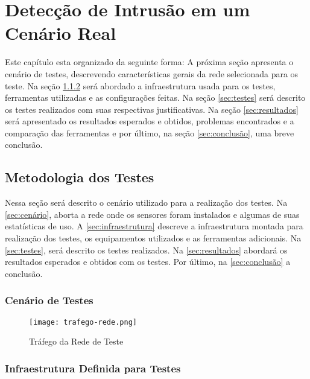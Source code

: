 \chapter{Detecção de Intrusão em um Cenário Real} \label{ch:cenário-real}

Este capítulo esta organizado da seguinte forma: A próxima seção apresenta o cenário de testes, descrevendo características gerais da rede selecionada para os teste. Na seção \ref{sec:infraestrutura} será abordado a infraestrutura usada para os testes, ferramentas utilizadas e as configurações feitas. Na seção \ref{sec:testes} será descrito os testes realizados com suas respectivas justificativas. Na seção \ref{sec:resultados} será apresentado os resultados esperados e obtidos, problemas encontrados e a comparação das ferramentas e por último, na seção \ref{sec:conclusão}, uma breve conclusão.

\section{Metodologia dos Testes}

Nessa seção será descrito o cenário utilizado para a realização dos testes. Na \autoref{sec:cenário}, aborta a rede onde os sensores foram instalados e algumas de suas estatísticas de uso. A \autoref{sec:infraestrutura} descreve a infraestrutura montada para realização dos testes, os equipamentos utilizados e as ferramentas adicionais. Na \autoref{sec:testes}, será descrito os testes realizados. Na \autoref{sec:resultados} abordará os resultados esperados e obtidos com os testes. Por último, na \autoref{sec:conclusão} a conclusão.

\subsection{Cenário de Testes} \label{sec:cenário}

\begin{figure}[!htb]
\centering
\caption{Tráfego da Rede de Teste}
\texttt{[image: trafego-rede.png]}
\label{fig:trafego-rede}
\end{figure}


\subsection{Infraestrutura Definida para Testes} \label{sec:infraestrutura}

